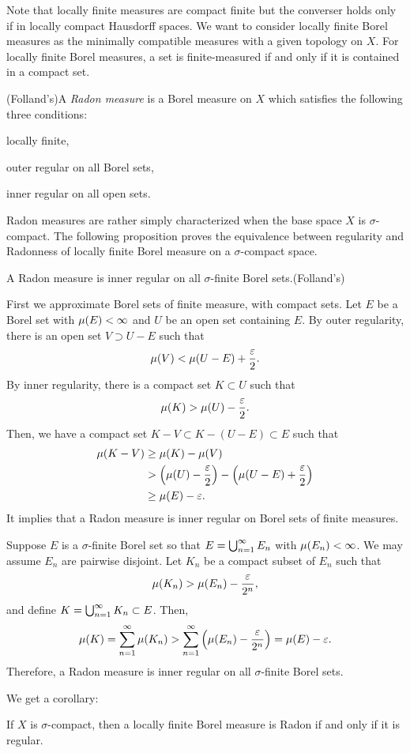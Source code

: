 \documentclass{../crs}
\begin{document}
Note that locally finite measures are compact finite but the converser holds only if in locally compact Hausdorff spaces.
We want to consider locally finite Borel measures as the minimally compatible measures with a given topology on $X$.
For locally finite Borel measures, a set is finite-measured if and only if it is contained in a compact set.
\begin{defn}
(Folland's)A \emph{Radon measure} is a Borel measure on $X$ which satisfies the following three conditions:
\begin{cond}
\item locally finite,
\item outer regular on all Borel sets,
\item inner regular on all open sets.
\end{cond}
\end{defn}

Radon measures are rather simply characterized when the base space $X$ is $\sigma$-compact.
The following proposition proves the equivalence between regularity and Radonness of locally finite Borel measure on a $\sigma$-compact space.
\begin{prop}
A Radon measure is inner regular on all $\sigma$-finite Borel sets.(Folland's)
\end{prop}
\begin{pf}
First we approximate Borel sets of finite measure, with compact sets.
Let $E$ be a Borel set with $\mu(E)<\infty$ and $U$ be an open set containing $E$.
By outer regularity, there is an open set $V\supset U-E$ such that
\[\mu(V)<\mu(U-E)+\frac{\varepsilon}2.\]
By inner regularity, there is a compact set $K\subset U$ such that
\[\mu(K)>\mu(U)-\frac{\varepsilon}2.\]
Then, we have a compact set $K-V\subset K-(U-E)\subset E$ such that
\begin{align*}
\mu(K-V)&\ge\mu(K)-\mu(V)\\
&>\left(\mu(U)-\frac{\varepsilon}2\right)-\left(\mu(U-E)+\frac{\varepsilon}2\right)\\
&\ge\mu(E)-\varepsilon.
\end{align*}
It implies that a Radon measure is inner regular on Borel sets of finite measures.

Suppose $E$ is a $\sigma$-finite Borel set so that $E=\bigcup_{n=1}^\infty E_n$ with $\mu(E_n)<\infty$.
We may assume $E_n$ are pairwise disjoint.
Let $K_n$ be a compact subset of $E_n$ such that
\[\mu(K_n)>\mu(E_n)-\frac{\varepsilon}{2^n},\]
and define $K=\bigcup_{n=1}^\infty K_n\subset E$.
Then,
\[\mu(K)=\sum_{n=1}^\infty\mu(K_n)>\sum_{n=1}^\infty\left(\mu(E_n)-\frac{\varepsilon}{2^n}\right)=\mu(E)-\varepsilon.\]
Therefore, a Radon measure is inner regular on all $\sigma$-finite Borel sets.
\end{pf}
We get a corollary:
\begin{cor}
If $X$ is $\sigma$-compact, then a locally finite Borel measure is Radon if and only if it is regular.
\end{cor}
\end{document}
